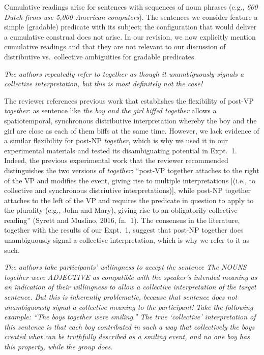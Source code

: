\documentclass[12pt]{article}
\begin{document}
Cumulative readings arise for sentences with sequences of noun phrases (e.g., \emph{600 Dutch firms use 5,000 American computers}). The sentences we consider feature a simple (gradable) predicate with its subject; the configuration that would deliver a cumulative construal does not arise. In our revision, we now explicitly mention cumulative readings and that they are not relevant to our discussion of distributive vs.~collective ambiguities for gradable predicates.

\item \emph{The authors repeatedly refer to \emph{together} as though it unambiguously signals a collective interpretation, but this is most definitely not the case!}

The reviewer references previous work that establishes the flexibility of post-VP \emph{together}: as sentence like \emph{the boy and the girl biffed together} allows a spatiotemporal, synchronous distributive interpretation whereby the boy and the girl are close as each of them biffs at the same time. However, we lack evidence of a similar flexibility for post-NP \emph{together}, which is why we used it in our experimental materials and tested its disambiguating potential in Expt.~1. Indeed, the previous experimental work that the reviewer recommended distinguishes the two versions of \emph{together}: 
``post-VP together attaches to the right of the VP and modifies the event, giving rise to multiple interpretations [(i.e., to collective and synchronous distriutive interpretations)], while post-NP together attaches to the left of the VP and requires the predicate in question to apply to the plurality (e.g., John and Mary), giving rise to an obligatorily collective reading'' (Syrett and Muslino, 2016, fn.~1). The consensus in the literature, together with the results of our Expt.~1, suggest that post-NP together does unambiguously signal a collective interpretation, which is why we refer to it as such.

\item \emph{The authors take participants' willingness to accept the sentence \emph{The NOUNS together were ADJECTIVE} as compatible with the speaker's intended meaning as an indication of their willingness to allow a collective interpretation of the target sentence. But this is inherently problematic, because that sentence does not unambiguously signal a collective meaning to the participant! Take the following example: ``The boys together were smiling.'' The true `collective' interpretation of this sentence is that each boy contributed in such a way that collectively the boys created what can be truthfully described as a smiling event, and no one boy has this property, while the group does.}
\end{document}
